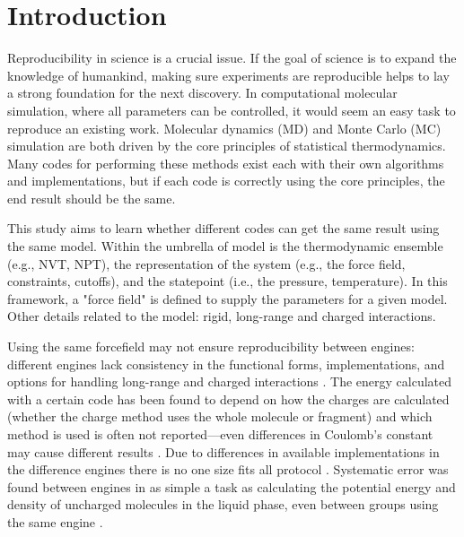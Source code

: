 \section{Introduction}
Reproducibility in science is a crucial issue.
If the goal of science is to expand the knowledge of humankind, making sure experiments are reproducible helps to lay a strong foundation for the next discovery.
In computational molecular simulation, where all parameters can be controlled, it would seem an easy task to reproduce an existing work.
Molecular dynamics (MD) and Monte Carlo (MC) simulation are both driven by the core principles of statistical thermodynamics.
Many codes for performing these methods exist each with their own algorithms and implementations, but if each code is correctly using the core principles, the end result should be the same.

This study aims to learn whether different codes can get the same result using the same model.
Within the umbrella of model is the thermodynamic ensemble (e.g., NVT, NPT), the representation of the system (e.g., the force field, constraints, cutoffs), and the statepoint (i.e., the pressure, temperature).
In this framework, a "force field" is defined to supply the parameters for a given model.
Other details related to the model: rigid, long-range and charged interactions.

Using the same forcefield may not ensure reproducibility between engines: different engines lack consistency in the functional forms, implementations, and options for handling long-range and charged interactions \citep{Rizzi2020}. 
The energy calculated with a certain code has been found to depend on how the charges are calculated (whether the charge method uses the whole molecule or fragment) and which method is used is often not reported---even differences in Coulomb's constant may cause different results \citep{Shirts2017}.
Due to differences in available implementations in the difference engines there is no one size fits all protocol \citep{Loeffler2018}.
Systematic error was found between engines in as simple a task as calculating the potential energy and density of uncharged molecules in the liquid phase, even between groups using the same engine \citep{Schappals2017}.

